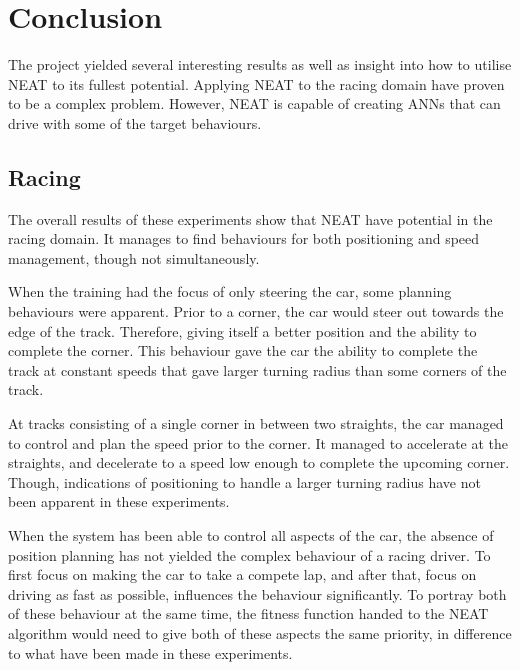 \chapter{Conclusion}
\label{conclusion}
The project yielded several interesting results as well as insight into how to utilise NEAT to its fullest potential. Applying NEAT to the racing domain have proven to be a complex problem. However, NEAT is capable of creating ANNs that can drive with some of the target behaviours.


\section{Racing}
\label{conclusion_racing}
The overall results of these experiments show that NEAT have potential in the racing domain. It manages to find behaviours for both positioning and speed management, though not simultaneously. 

When the training had the focus of only steering the car, some planning behaviours were apparent. Prior to a corner, the car would steer out towards the edge of the track. Therefore, giving itself a better position and the ability to complete the corner. This behaviour gave the car the ability to complete the track at constant speeds that gave larger turning radius than some corners of the track.

At tracks consisting of a single corner in between two straights, the car managed to control and plan the speed prior to the corner. It managed to accelerate at the straights, and decelerate to a speed low enough to complete the upcoming corner. Though, indications of positioning to handle a larger turning radius have not been apparent in these experiments.

When the system has been able to control all aspects of the car, the absence of position planning has not yielded the complex behaviour of a racing driver. To first focus on making the car to take a compete lap, and after that, focus on driving as fast as possible, influences the behaviour significantly. To portray both of these behaviour at the same time, the fitness function handed to the NEAT algorithm would need to give both of these aspects the same priority, in difference to what have been made in these experiments.


